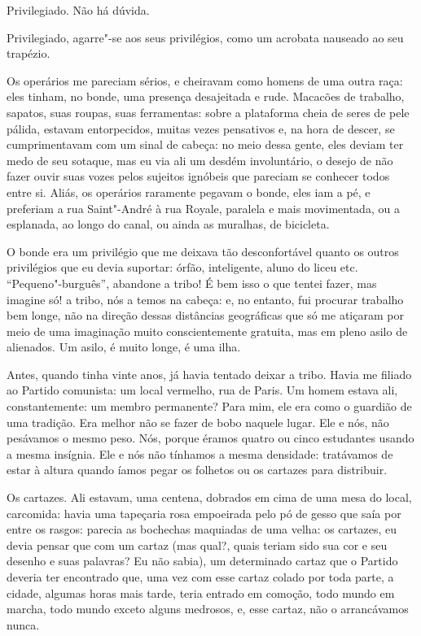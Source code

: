 Privilegiado. Não há dúvida.

Privilegiado, agarre"-se aos seus privilégios, como um acrobata nauseado
ao seu trapézio.

Os operários me pareciam sérios, e cheiravam como homens de uma outra
raça: eles tinham, no bonde, uma presença desajeitada e rude. Macacões
de trabalho, sapatos, suas roupas, suas ferramentas: sobre a plataforma
cheia de seres de pele pálida, estavam entorpecidos, muitas vezes
pensativos e, na hora de descer, se cumprimentavam com um sinal de
cabeça: no meio dessa gente, eles deviam ter medo de seu sotaque, mas eu
via ali um desdém involuntário, o desejo de não fazer ouvir suas vozes
pelos sujeitos ignóbeis que pareciam se conhecer todos entre si. Aliás,
os operários raramente pegavam o bonde, eles iam a pé, e preferiam a rua
Saint"-André à rua Royale, paralela e mais movimentada, ou a esplanada,
ao longo do canal, ou ainda as muralhas, de bicicleta.

O bonde era um privilégio que me deixava tão desconfortável quanto os
outros privilégios que eu devia suportar: órfão, inteligente, aluno do
liceu etc. ``Pequeno"-burguês'', abandone a tribo! É bem isso o que
tentei fazer, mas imagine só! a tribo, nós a temos na cabeça: e, no
entanto, fui procurar trabalho bem longe, não na direção dessas
distâncias geográficas que só me atiçaram por meio de uma imaginação
muito conscientemente gratuita, mas em pleno asilo de alienados. Um
asilo, é muito longe, é uma ilha.

Antes, quando tinha vinte anos, já havia tentado deixar a tribo. Havia
me filiado ao Partido comunista: um local vermelho, rua de Paris. Um
homem estava ali, constantemente: um membro permanente? Para mim, ele
era como o guardião de uma tradição. Era melhor não se fazer de bobo
naquele lugar. Ele e nós, não pesávamos o mesmo peso. Nós, porque éramos
quatro ou cinco estudantes usando a mesma insígnia. Ele e nós não
tínhamos a mesma densidade: tratávamos de estar à altura quando íamos
pegar os folhetos ou os cartazes para distribuir.

Os cartazes. Ali estavam, uma centena, dobrados em cima de uma mesa do
local, carcomida: havia uma tapeçaria rosa empoeirada pelo pó de gesso
que saía por entre os rasgos: parecia as bochechas maquiadas de uma
velha: os cartazes, eu devia pensar que com um cartaz (mas qual?, quais
teriam sido sua cor e seu desenho e suas palavras? Eu não sabia), um
determinado cartaz que o Partido deveria ter encontrado que, uma vez com esse cartaz colado
por toda parte, a cidade, algumas horas mais tarde, teria entrado
em comoção, todo mundo em marcha, todo mundo exceto alguns medrosos, e,
esse cartaz, não o arrancávamos nunca.

